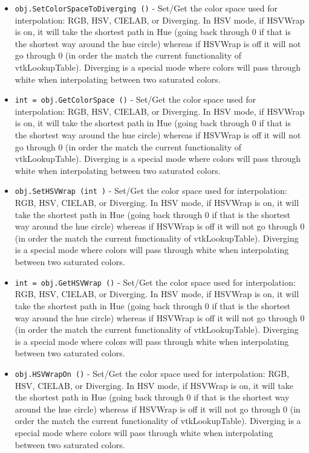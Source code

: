 \begin{itemize}
\item  \verb|obj.SetColorSpaceToDiverging ()| -  Set/Get the color space used for interpolation: RGB, HSV, CIELAB, or
 Diverging.  In HSV mode, if HSVWrap is on, it will take the shortest path
 in Hue (going back through 0 if that is the shortest way around the hue
 circle) whereas if HSVWrap is off it will not go through 0 (in order the
 match the current functionality of vtkLookupTable).  Diverging is a special
 mode where colors will pass through white when interpolating between two
 saturated colors.

\item  \verb|int = obj.GetColorSpace ()| -  Set/Get the color space used for interpolation: RGB, HSV, CIELAB, or
 Diverging.  In HSV mode, if HSVWrap is on, it will take the shortest path
 in Hue (going back through 0 if that is the shortest way around the hue
 circle) whereas if HSVWrap is off it will not go through 0 (in order the
 match the current functionality of vtkLookupTable).  Diverging is a special
 mode where colors will pass through white when interpolating between two
 saturated colors.

\item  \verb|obj.SetHSVWrap (int )| -  Set/Get the color space used for interpolation: RGB, HSV, CIELAB, or
 Diverging.  In HSV mode, if HSVWrap is on, it will take the shortest path
 in Hue (going back through 0 if that is the shortest way around the hue
 circle) whereas if HSVWrap is off it will not go through 0 (in order the
 match the current functionality of vtkLookupTable).  Diverging is a special
 mode where colors will pass through white when interpolating between two
 saturated colors.

\item  \verb|int = obj.GetHSVWrap ()| -  Set/Get the color space used for interpolation: RGB, HSV, CIELAB, or
 Diverging.  In HSV mode, if HSVWrap is on, it will take the shortest path
 in Hue (going back through 0 if that is the shortest way around the hue
 circle) whereas if HSVWrap is off it will not go through 0 (in order the
 match the current functionality of vtkLookupTable).  Diverging is a special
 mode where colors will pass through white when interpolating between two
 saturated colors.

\item  \verb|obj.HSVWrapOn ()| -  Set/Get the color space used for interpolation: RGB, HSV, CIELAB, or
 Diverging.  In HSV mode, if HSVWrap is on, it will take the shortest path
 in Hue (going back through 0 if that is the shortest way around the hue
 circle) whereas if HSVWrap is off it will not go through 0 (in order the
 match the current functionality of vtkLookupTable).  Diverging is a special
 mode where colors will pass through white when interpolating between two
 saturated colors.


\end{itemize}
